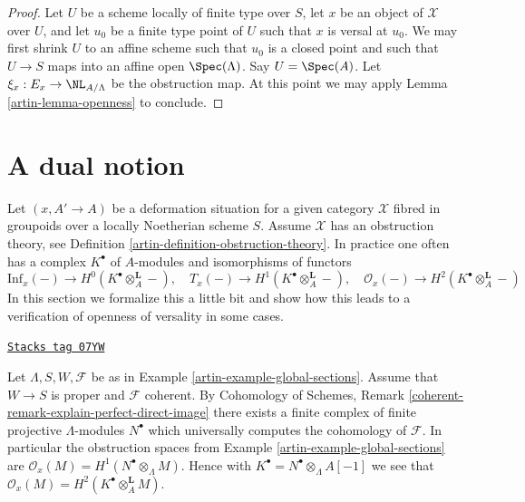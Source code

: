 \begin{proof}

Let $U$ be a scheme locally of finite type over $S$, let $x$ be an object of
$\mathcal{X}$ over $U$, and let $u_0$ be a finite type point of $U$ such that
$x$ is versal at $u_0$. We may first shrink $U$ to an affine scheme such
that $u_0$ is a closed point and such that $U \to S$ maps into an affine
open $\Spec(\Lambda)$. Say $U = \Spec(A)$. Let
$\xi_x : E_x \to \NL_{A/\Lambda}$ be the obstruction map.
At this point we may apply Lemma \ref{artin-lemma-openness} to conclude.
\end{proof}

\section{A dual notion}
\label{artin-section-dual}
Let $(x, A' \to A)$ be a deformation situation for a given category
$\mathcal{X}$ fibred in groupoids over a locally Noetherian scheme $S$.
Assume $\mathcal{X}$ has an obstruction theory, see
Definition \ref{artin-definition-obstruction-theory}. In practice
one often has a complex $K^\bullet$ of $A$-modules and isomorphisms of
functors
$$
\text{Inf}_x(-) \to H^0(K^\bullet \otimes_A^\mathbf{L} -),\quad
T_x(-) \to H^1(K^\bullet \otimes_A^\mathbf{L} -),\quad
\mathcal{O}_x(-) \to H^2(K^\bullet \otimes_A^\mathbf{L} -)
$$
In this section we formalize this a little bit and show how this leads
to a verification of openness of versality in some cases.

\begin{example}
\label{artin-example-global-sections-dual}
\href{https://stacks.math.columbia.edu/tag/07YW}{\texttt{Stacks tag 07YW}}

Let $\Lambda, S, W, \mathcal{F}$ be as in
Example \ref{artin-example-global-sections}.
Assume that $W \to S$ is proper and $\mathcal{F}$ coherent. By
Cohomology of Schemes, Remark
\ref{coherent-remark-explain-perfect-direct-image}
there exists a finite complex of finite projective $\Lambda$-modules
$N^\bullet$ which universally computes the cohomology of $\mathcal{F}$.
In particular the obstruction spaces from Example \ref{artin-example-global-sections}
are $\mathcal{O}_x(M) = H^1(N^\bullet \otimes_\Lambda M)$.
Hence with $K^\bullet = N^\bullet \otimes_\Lambda A[-1]$ we see that
$\mathcal{O}_x(M) = H^2(K^\bullet \otimes_A^\mathbf{L} M)$.
\end{example}

